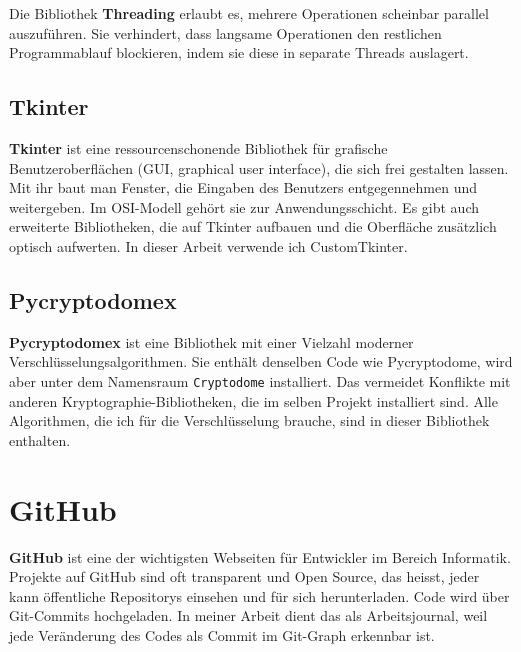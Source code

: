 Die Bibliothek \textbf{Threading} erlaubt es, mehrere Operationen scheinbar parallel auszuführen.\citep{ThreadingThreadbasedParallelism} Sie verhindert, dass langsame Operationen den restlichen Programmablauf blockieren, indem sie diese in separate Threads auslagert.

\subsection{Tkinter}

\textbf{Tkinter} ist eine ressourcenschonende Bibliothek für grafische Benutzeroberflächen (GUI, graphical user interface), die sich frei gestalten lassen.\citep{engineerTkinterTutorial20262023} Mit ihr baut man Fenster, die Eingaben des Benutzers entgegennehmen und weitergeben. Im OSI-Modell gehört sie zur Anwendungsschicht. Es gibt auch erweiterte Bibliotheken, die auf Tkinter aufbauen und die Oberfläche zusätzlich optisch aufwerten. In dieser Arbeit verwende ich CustomTkinter.\citep{CustomTkinterDocs}

\subsection{Pycryptodomex}

\textbf{Pycryptodomex} ist eine Bibliothek mit einer Vielzahl moderner Verschlüsselungsalgorithmen.\citep{PyCryptodomeDocs} Sie enthält denselben Code wie Pycryptodome, wird aber unter dem Namensraum \texttt{Cryptodome} installiert. Das vermeidet Konflikte mit anderen Kryptographie-Bibliotheken, die im selben Projekt installiert sind. Alle Algorithmen, die ich für die Verschlüsselung brauche, sind in dieser Bibliothek enthalten.

\section{GitHub}

\textbf{GitHub} ist eine der wichtigsten Webseiten für Entwickler im Bereich Informatik. Projekte auf GitHub sind oft transparent und Open Source, das heisst, jeder kann öffentliche Repositorys einsehen und für sich herunterladen. Code wird über Git-Commits hochgeladen. In meiner Arbeit dient das als Arbeitsjournal, weil jede Veränderung des Codes als Commit im Git-Graph erkennbar ist.